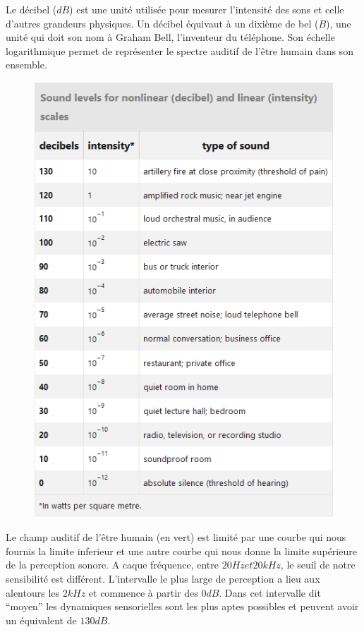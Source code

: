 \documentclass[conference,onecolumn]{IEEEtran}
\begin{document}
Le décibel ($dB$) est une unité utilisée pour mesurer l'intensité des sons et celle d'autres grandeurs physiques. Un décibel équivaut à un dixième de bel ($B$), une unité qui doit son nom à Graham Bell, l'inventeur du téléphone. Son échelle logarithmique permet de représenter le spectre auditif de l’être humain dans son ensemble.

\begin{figure}[H]
 \centering
    \includegraphics[scale=0.6]{img2.png}
\end{figure}

 Le champ auditif de l’être humain (en vert) est limité par une courbe qui nous fournis la limite inferieur et une autre courbe qui nous donne la limite supérieure de la perception sonore. A caque fréquence, entre $20 Hz et 20 kHz$, le seuil de notre sensibilité est différent. L’intervalle le plus large de perception a lieu aux alentours les $2 kHz$ et commence à partir des $0 dB$. Dans cet intervalle dit “moyen” les dynamiques sensorielles sont les plus aptes possibles et peuvent avoir un équivalent de $130 dB$.
 
\end{document}

